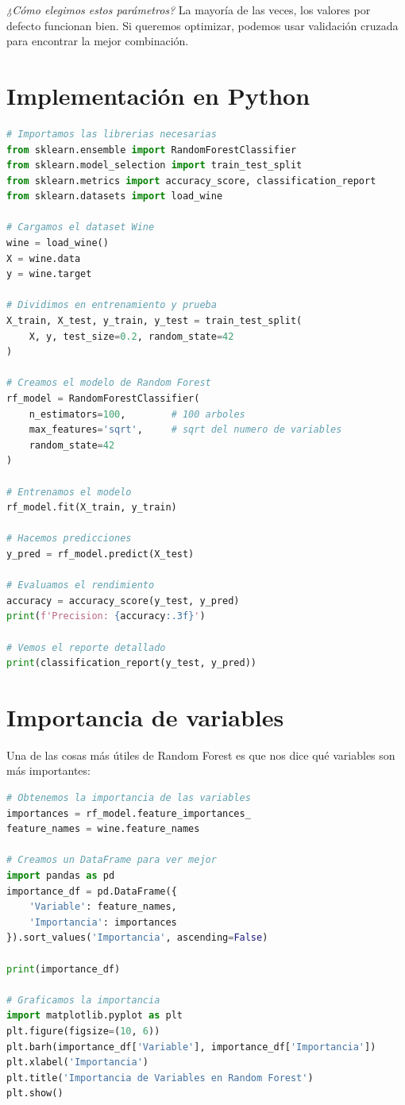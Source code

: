 \documentclass[12pt]{article}
\begin{document}
\textit{¿Cómo elegimos estos parámetros?} La mayoría de las veces, los valores por defecto funcionan bien. Si queremos optimizar, podemos usar validación cruzada para encontrar la mejor combinación.

\section{Implementación en Python}
\begin{lstlisting}[language=Python]
# Importamos las librerias necesarias
from sklearn.ensemble import RandomForestClassifier
from sklearn.model_selection import train_test_split
from sklearn.metrics import accuracy_score, classification_report
from sklearn.datasets import load_wine

# Cargamos el dataset Wine
wine = load_wine()
X = wine.data
y = wine.target

# Dividimos en entrenamiento y prueba
X_train, X_test, y_train, y_test = train_test_split(
    X, y, test_size=0.2, random_state=42
)

# Creamos el modelo de Random Forest
rf_model = RandomForestClassifier(
    n_estimators=100,        # 100 arboles
    max_features='sqrt',     # sqrt del numero de variables
    random_state=42
)

# Entrenamos el modelo
rf_model.fit(X_train, y_train)

# Hacemos predicciones
y_pred = rf_model.predict(X_test)

# Evaluamos el rendimiento
accuracy = accuracy_score(y_test, y_pred)
print(f'Precision: {accuracy:.3f}')

# Vemos el reporte detallado
print(classification_report(y_test, y_pred))
\end{lstlisting}

\section{Importancia de variables}
Una de las cosas más útiles de Random Forest es que nos dice qué variables son más importantes:

\begin{lstlisting}[language=Python]
# Obtenemos la importancia de las variables
importances = rf_model.feature_importances_
feature_names = wine.feature_names

# Creamos un DataFrame para ver mejor
import pandas as pd
importance_df = pd.DataFrame({
    'Variable': feature_names,
    'Importancia': importances
}).sort_values('Importancia', ascending=False)

print(importance_df)

# Graficamos la importancia
import matplotlib.pyplot as plt
plt.figure(figsize=(10, 6))
plt.barh(importance_df['Variable'], importance_df['Importancia'])
plt.xlabel('Importancia')
plt.title('Importancia de Variables en Random Forest')
plt.show()
\end{lstlisting}
\end{document}
